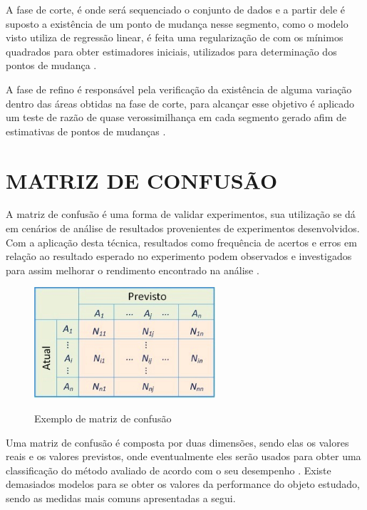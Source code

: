 A fase de corte, é onde será sequenciado o conjunto de dados e a partir dele é suposto a existência de um ponto de mudança nesse segmento, como o modelo visto utiliza de regressão linear, é feita uma regularização de com os mínimos quadrados para obter estimadores iniciais, utilizados para determinação dos pontos de mudança \cite{Jin2016}. 

A fase de refino é responsável pela verificação da existência de alguma variação dentro das áreas obtidas na fase de corte, para alcançar esse objetivo é aplicado um teste de razão de quase verossimilhança em cada segmento gerado afim de estimativas de pontos de mudanças \cite{Jin2016}.

\section{MATRIZ DE CONFUSÃO}
\label{sec:matrizDeConfusao}

A matriz de confusão é uma forma de validar experimentos, sua utilização se dá em cenários de análise de resultados provenientes de experimentos desenvolvidos. Com a aplicação desta técnica, resultados como frequência de acertos e erros em relação ao resultado esperado no experimento podem observados e investigados para assim melhorar o rendimento encontrado na análise \cite{Ruuska2018}.

\begin{figure}[!htb]
    \centering
    \caption{Exemplo de matriz de confusão}
    \includegraphics[width=0.6\textwidth]{./dados/figuras/matriz-de-confusao}
    \label{fig:matriz-confusao}
\end{figure}

Uma matriz de confusão é composta por duas dimensões, sendo elas os valores reais e os valores previstos, onde eventualmente eles serão usados para obter uma classificação do método avaliado de acordo com o seu desempenho \cite{Deng2016}. Existe demasiados modelos para se obter os valores da performance do objeto estudado, sendo as medidas mais comuns apresentadas a segui.

